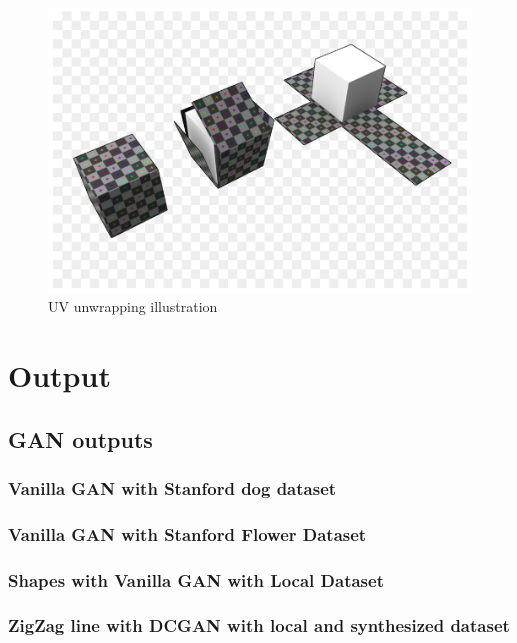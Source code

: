 \documentclass{article}
\begin{document}
\begin{figure}[H]
    \centering
    \includegraphics[width=15cm]{images/UVUnwrapping.png}
    \caption{UV unwrapping illustration}
\end{figure}


    
\newpage    
\section{Output}

\subsection{GAN outputs}

\subsubsection{Vanilla GAN with Stanford dog dataset}

\subsubsection{Vanilla GAN with Stanford Flower Dataset}

\subsubsection{Shapes with Vanilla GAN with Local Dataset}

\subsubsection{ZigZag line with DCGAN with local and synthesized dataset}
\end{document}
